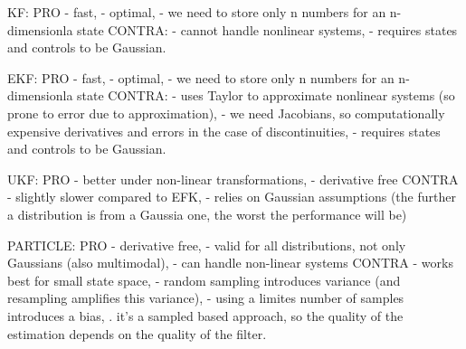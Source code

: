 KF:
PRO
- fast, 
- optimal, 
- we need to store only n numbers for an n-dimensionla state
CONTRA:
- cannot handle nonlinear systems, 
- requires states and controls to be Gaussian. 

EKF:
PRO
- fast, 
- optimal, 
- we need to store only n numbers for an n-dimensionla state
CONTRA:
- uses Taylor to approximate nonlinear systems (so prone to error due to approximation), 
- we need Jacobians, so computationally expensive derivatives and errors in the case of discontinuities, 
- requires states and controls to be Gaussian. 

UKF:
PRO
- better under non-linear transformations,
- derivative free
CONTRA
- slightly slower compared to EFK,
- relies on Gaussian assumptions (the further a distribution is from a Gaussia one, the worst the performance will be)

PARTICLE:
PRO
- derivative free,
- valid for all distributions, not only Gaussians (also multimodal),
- can handle non-linear systems
CONTRA
- works best for small state space,
- random sampling introduces variance (and resampling amplifies this variance),
- using a limites number of samples introduces a bias,
. it's a sampled based approach, so the quality of the estimation depends on the quality of the filter.

